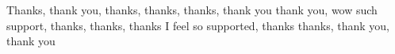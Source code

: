 Thanks, thank you, thanks, thanks, thanks, thank you thank you, wow such support, thanks, thanks, thanks I feel so supported, thanks thanks, thank you, thank you






